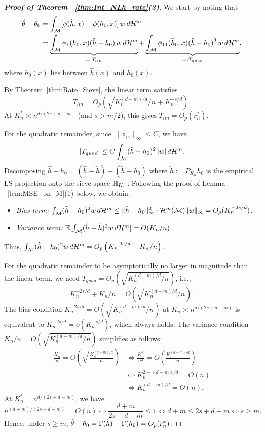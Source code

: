 \documentclass[12pt,american]{article}
\newcommand{\cH}{\mathcal{H}}
\theoremstyle{definition}
\theoremstyle{plain}
\theoremstyle{definition}
\theoremstyle{plain}
\theoremstyle{plain}
\theoremstyle{plain}
\theoremstyle{plain}
\theoremstyle{plain}
\newcommand{\E}{\mathbb{E}}
\begin{document}
\begin{proof}[\textbf{Proof of Theorem ~\ref{thm:Int_NLh_rate}(3)}] We start by noting that
\begin{align}
\hat{\t} - \t_0 &= \int_\cM [\phi(\hat{h},x) - \phi(h_0,x)]\, w\, d\cH^m \notag\\
&= \underbrace{\int_\cM \phi_1(h_0,x)(\hat{h} - h_0)\, w\, d\cH^m}_{=: T_{lin}} + \underbrace{\int_\cM \phi_{11}(\bar{h}_0,x)(\hat{h} - h_0)^2\, w\, d\cH^m}_{=: T_{quad}}, \label{eq:plugin_decomp}
\end{align}
where $\bar{h}_0(x)$ lies between $\hat{h}(x)$ and $h_0(x)$.

By Theorem~\ref{thm:Rate_Sieve}, the linear term satisfies
\[
T_{lin} = O_p\left(\sqrt{K_n^{(d-m)/d}/n} + K_n^{-s/d}\right).
\]
At $K^*_n \asymp n^{d/(2s+d-m)}$ (and $s>m/2$), this gives $T_{lin} = O_p(r_n^*)$.

For the quadratic remainder, since $\|\phi_{11}\|_\infty \le C$, we have
\[
|T_{quad}| \le C \int_\cM (\hat{h} - h_0)^2\, |w|\, d\cH^m.
\]
Decomposing $\hat{h} - h_0 = (\hat{h} - \tilde{h}) + (\tilde{h} - h_0)$ where $\tilde{h} := P_{K_n}h_0$ is the empirical LS projection onto the sieve space ${\mathbb{H}}_{K_n}$.
Following the proof of Lemma ~\ref{lem:MSE_on_M}(1) below, we obtain:
\begin{itemize}
    \item \textit{Bias term:} $\int_\cM (\tilde{h} - h_0)^2 w\, d\cH^m \le \|\tilde{h} - h_0\|_\infty^2 \cdot \cH^m(\cM)\|w\|_\infty = O_p(K_n^{-2s/d})$.
    \item \textit{Variance term:} $\E[\int_\cM (\hat{h} - \tilde{h})^2 w\, d\cH^m] = O(K_n/n)$.
\end{itemize}
Thus, $\int_\cM (\hat{h} - h_0)^2 w\, d\cH^m = O_p\left(K_n^{-2s/d} + K_n/n \right)$.

For the quadratic remainder to be asymptotically no larger in magnitude than the linear term,
we need $T_{quad} = O_p(\sqrt{K_n^{(d-m)/d}/n})$, i.e.,
\[
K_n^{-2s/d} + K_n/n = O\left(\sqrt{K_n^{(d-m)/d}/n}\right).
\]
The bias condition $K_n^{-2s/d} = O(\sqrt{K_n^{(d-m)/d}/n})$ at $K_n \asymp n^{d/(2s+d-m)}$  is equivalent to $K_n^{-2s/d} = o(K_n^{-s/d})$, which always holds.
The variance condition $K_n/n = O(\sqrt{K_n^{(d-m)/d}/n})$ simplifies as follows:
    \begin{align*}
    \frac{K_n}{n} = O\left(\sqrt{\frac{K_n^{(d-m)/d}}{n}}\right)
    &\iff \frac{K_n^2}{n^2} = O\left(\frac{K_n^{(d-m)/d}}{n}\right) \\
    &\iff K_n^{2 - (d-m)/d} = O(n) \\
    &\iff K_n^{(d+m)/d} = O(n).
    \end{align*}
At $K^*_n = n^{d/(2s+d-m)}$, we have
    \[
    n^{(d+m)/(2s+d-m)} = O(n) \iff \frac{d+m}{2s+d-m} \leq 1 \iff d + m \leq 2s + d - m \iff s \geq m.
    \]
Hence, under $s \ge m$, $\hat{\theta} - \theta_0 =\Gamma(\hat{h})-\Gamma(h_0)= O_p(r_n^*)$.
\end{proof}
\end{document}
